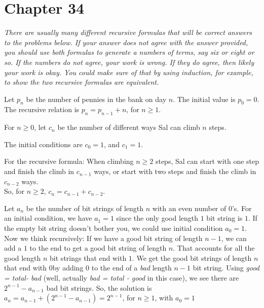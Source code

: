    \section*{Chapter 34}
   
   {\it There are usually many different recursive formulas that will be correct answers to the problems below.
   If your answer does not agree with the answer provided, you should use both formulas to generate a numbers of terms, say six or eight or so. If the numbers do not agree, your work is wrong. If they do agree, then likely your work is okay. You could make sure of that by using induction, for example, to show the two recursive formulas are equivalent.}
   
\begin{Solution}{34.1}  
Let $p_{n}$ be the number of pennies in the bank on day $n$. The initial value is $p_{0}= 0$.
The recursive relation is $p_{n}= p_{n-1} + n$, for $n\geq 1$.     
\end{Solution}


\begin{Solution}{34.2}

For $n\geq 0$, let $c_n$ be the number of different ways Sal can climb $n$ steps.

The initial conditions are $c_0 = 1$, and $c_1 = 1$. 

For the recursive formula: When climbing $n\geq 2$ steps, Sal can start with one step and finish the climb in $c_{n-1}$ ways, or start with two steps and finish the climb in $c_{n-2}$ ways. \\
 So, for $n\geq 2$, $c_n = c_{n-1}+c_{n-2}$.

\end{Solution}

\begin{Solution}{34.3}
Let $a_{n}$ be the number of bit strings of length $n$ with an even number of $0$'s. For an initial condition, we have $a_{1} =1$
since the only good length $1$ bit string is $1$. If the empty bit string doesn't bother you, we could use initial condition $a_{0} = 1$.
Now we think recursively: If we have a good bit string of length $n-1$, we can add a $1$ to the end to get a good bit string of length $n$.
That accounts for all the good length $n$ bit strings that end with $1$. We get the good bit strings of length $n$ that end with $0$by adding $0$
to the end of a {\it bad} length $n-1$ bit string. Using {\it good = total- bad} (well, actually {\it bad = total - good} in this case), we see there are $2^{n-1} -a_{n-1}$ bad bit strings. So, the solution is $a_{n} = a_{n-1} + (2^{n-1} - a_{n-1}) = 2^{n-1}$, for $n\geq 1$, with $a_{0}=1$
\end{Solution}

